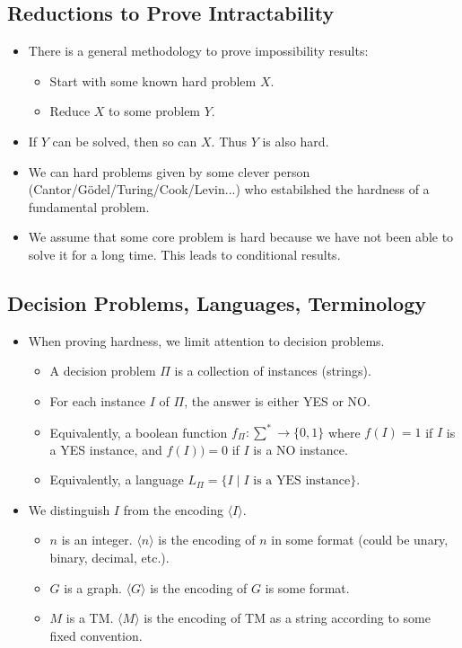 \subsection{Reductions to Prove Intractability}
\begin{itemize}
    \item There is a general methodology to prove impossibility results:
    \begin{itemize}
        \item Start with some known hard problem $X$.
        \item Reduce $X$ to some problem $Y$.
    \end{itemize}
    \item If $Y$ can be solved, then so can $X$. Thus $Y$ is also hard.
    \item We can hard problems given by some clever person (Cantor/Gödel/Turing/Cook/Levin...) who estabilshed the hardness of a fundamental problem.
    \item We assume that some core problem is hard because we have not been able to solve it for a long time. This leads to conditional results.
\end{itemize}

\subsection{Decision Problems, Languages, Terminology}
\begin{itemize}
    \item When proving hardness, we limit attention to decision problems.
    \begin{itemize}
        \item A decision problem $\Pi$ is a collection of instances (strings).
        \item For each instance $I$ of $\Pi$, the answer is either YES or NO.
        \item Equivalently, a boolean function $f_\Pi: \sum^\ast \rightarrow \{ 0, 1 \}$ where $f(I) = 1$ if $I$ is a YES instance, and $f(I)) = 0$ if $I$ is a NO instance.
        \item Equivalently, a language $L_\Pi = \{ I \mid \text{$I$ is a YES instance} \}$.
    \end{itemize}
    \item We distinguish $I$ from the encoding $\langle I \rangle$.
    \begin{itemize}
        \item $n$ is an integer. $\langle n \rangle$ is the encoding of $n$ in some format (could be unary, binary, decimal, etc.).
        \item $G$ is a graph. $\langle G \rangle$ is the encoding of $G$ is some format.
        \item $M$ is a TM. $\langle M \rangle$ is the encoding of TM as a string according to some fixed convention.
    \end{itemize}
\end{itemize}

